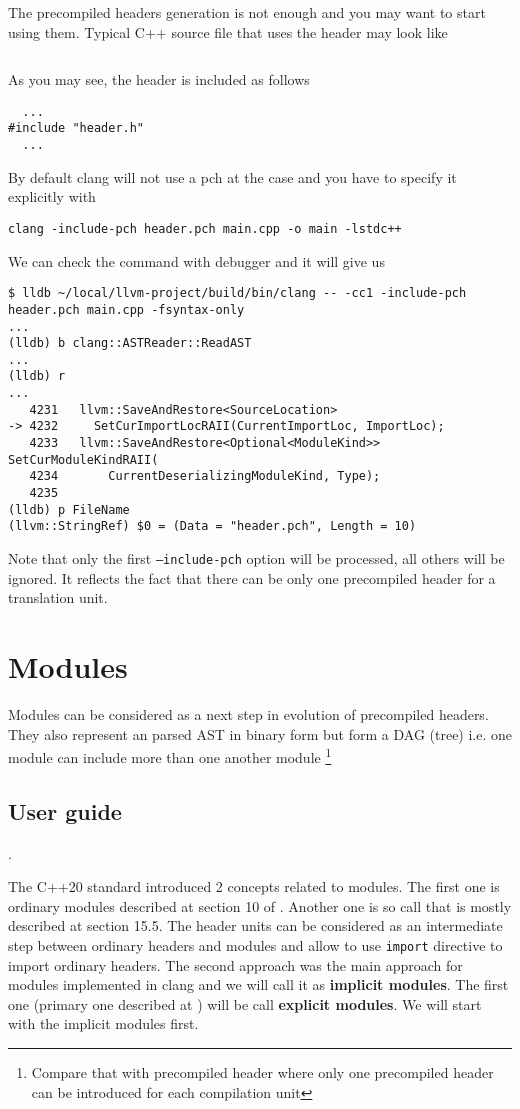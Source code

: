 The precompiled headers generation is not enough and you may want to
start using them. Typical C++ source file that uses the header may
look like
\inputminted{c++}{./src/pch/simple/main.cpp}
As you may see, the header is included as follows
\begin{verbatim}
  ...
#include "header.h"
  ...
\end{verbatim}
By default clang will not use a pch at the case and you have to
specify it explicitly with
\begin{verbatim}
clang -include-pch header.pch main.cpp -o main -lstdc++
\end{verbatim}
We can check the command with debugger and it will give us
\begin{verbatim}
$ lldb ~/local/llvm-project/build/bin/clang -- -cc1 -include-pch header.pch main.cpp -fsyntax-only
...
(lldb) b clang::ASTReader::ReadAST                                             
...
(lldb) r
...
   4231   llvm::SaveAndRestore<SourceLocation>
-> 4232     SetCurImportLocRAII(CurrentImportLoc, ImportLoc);
   4233   llvm::SaveAndRestore<Optional<ModuleKind>> SetCurModuleKindRAII(
   4234       CurrentDeserializingModuleKind, Type);
   4235 
(lldb) p FileName
(llvm::StringRef) $0 = (Data = "header.pch", Length = 10)
\end{verbatim}
Note that only the first \texttt{--include-pch} option will be
processed, all others will be ignored. It reflects the fact that there
can be only one precompiled header for a translation unit.

\section{Modules}
Modules can be considered as a next step in evolution of precompiled
headers. They also represent an parsed AST in binary form but form a
DAG (tree) i.e. one module can include more than one another module
\footnote{Compare that with precompiled header where only one
precompiled header can be introduced for each compilation unit}
\subsection{User guide}.

The C++20 standard \cite{book:ieee_cpp_20} introduced 2 concepts
related to modules. The first one is ordinary modules described at
section 10 of \cite{book:ieee_cpp_20}. Another one is so call
 that is mostly described at section 15.5.
The header units can be considered as an intermediate step between
ordinary headers and modules and allow to use
\texttt{import} directive to import ordinary headers. The
second approach was the main approach for modules implemented in clang
and we will call it as \textbf{implicit modules}. The first one (primary one
described at \cite{book:ieee_cpp_20}) will be call \textbf{explicit
  modules}. We will start with the implicit modules first.

